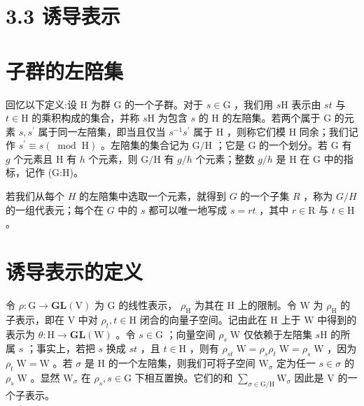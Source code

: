 \documentclass[10pt]{article}
\begin{document}
\section*{3.3 诱导表示}

\section*{子群的左陪集}

回忆以下定义:设 \(\mathrm{H}\) 为群 G 的一个子群。对于 \(s \in  \mathrm{G}\) ，我们用 \(s\mathrm{H}\) 表示由 \({st}\) 与 \(t \in  \mathrm{H}\) 的乘积构成的集合，并称 \(s\mathrm{H}\) 为包含 \(s\) 的 \(\mathrm{H}\) 的左陪集。若两个属于 \(\mathrm{G}\) 的元素 \(s,{s}^{\prime }\) 属于同一左陪集，即当且仅当 \({s}^{-1}{s}^{\prime }\) 属于 \(\mathrm{H}\) ，则称它们模 \(\mathrm{H}\) 同余；我们记作 \({s}^{\prime } \equiv  s\left( {\;\operatorname{mod}\;\mathrm{H}}\right)\) 。左陪集的集合记为 \(\mathrm{G}/\mathrm{H}\) ；它是 \(\mathrm{G}\) 的一个划分。若 \(\mathrm{G}\) 有 \(g\) 个元素且 \(\mathrm{H}\) 有 \(h\) 个元素，则 \(\mathrm{G}/\mathrm{H}\) 有 \(g/h\) 个元素；整数 \(g/h\) 是 \(\mathrm{H}\) 在 \(\mathrm{G}\) 中的指标，记作 (G:H)。

若我们从每个 \(H\) 的左陪集中选取一个元素，就得到 \(G\) 的一个子集 \(R\) ，称为 \(G/H\) 的一组代表元；每个在 \(G\) 中的 \(s\) 都可以唯一地写成 \(s = {rt}\) ，其中 \(r \in  \mathrm{R}\) 与 \(t \in  \mathrm{H}\) 。

\section*{诱导表示的定义}

令 \(\rho  : \mathrm{G} \rightarrow  \mathbf{{GL}}\left( \mathrm{V}\right)\) 为 \(\mathrm{G}\) 的线性表示， \({\rho }_{\mathrm{H}}\) 为其在 \(\mathrm{H}\) 上的限制。令 \(\mathrm{W}\) 为 \({\rho }_{\mathrm{H}}\) 的子表示，即在 \(\mathrm{V}\) 中对 \({\rho }_{t},t \in  \mathrm{H}\) 闭合的向量子空间。记由此在 \(\mathrm{H}\) 上于 \(\mathrm{W}\) 中得到的表示为 \(\theta  : \mathrm{H} \rightarrow  \mathbf{{GL}}\left( \mathrm{W}\right)\) 。令 \(s \in  \mathrm{G}\) ；向量空间 \({\rho }_{s}\mathrm{\;W}\) 仅依赖于左陪集 \(s\mathrm{H}\) 的所属 \(s\) ；事实上，若把 \(s\) 换成 \({st}\) ，且 \(t \in  \mathrm{H}\) ，则有 \({\rho }_{st}\mathrm{\;W} = {\rho }_{s}{\rho }_{t}\mathrm{\;W} = {\rho }_{s}\mathrm{\;W}\) ，因为 \({\rho }_{t}\mathrm{\;W} = \mathrm{W}\) 。若 \(\sigma\) 是 \(\mathrm{H}\) 的一个左陪集，则我们可将子空间 \({\mathrm{W}}_{\sigma }\) 定为任一 \(s \in  \sigma\) 的 \({\rho }_{s}\mathrm{\;W}\) 。显然 \({\mathrm{W}}_{\sigma }\) 在 \({\rho }_{s},s \in  \mathrm{G}\) 下相互置换。它们的和 \(\mathop{\sum }\limits_{{\sigma  \in  \mathrm{G}/\mathrm{H}}}{\mathrm{W}}_{\sigma }\) 因此是 \(\mathrm{V}\) 的一个子表示。
\end{document}
